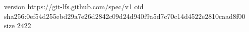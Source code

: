 version https://git-lfs.github.com/spec/v1
oid sha256:0ef54d255ebd29a7e26d2842c09d24d940f9a5d7c70c14d4522e2810caad8f00
size 2422
